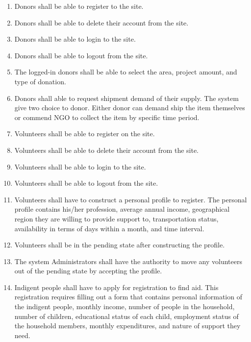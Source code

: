 \documentclass[a4paper,12pt]{report}
\begin{document}
	\begin{enumerate}
		\item Donors shall be able to register to the site.
		\item Donors shall be able to delete their account from the site.
		\item Donors shall be able to login to the site.
		\item Donors shall be able to logout from the site.
		\item The logged-in donors shall be able to select the area, project amount, and type of donation.
		
		\item Donors shall able to request shipment demand of their supply. The system give two choice to donor. Either donor can demand ship the item themselves or commend NGO to collect the item by specific time period.

		\item Volunteers shall be able to register on the site.
		
		\item Volunteers shall be able to delete their account from the site.
		\item Volunteers shall be able to login to the site.
		\item Volunteers shall be able to logout from the site.
		
		\item Volunteers shall have to construct a personal profile to register. The personal profile contains his/her profession, average annual income, geographical region they are willing to provide support to, transportation status, availability in terms of days within a month, and time interval.
		
		\item Volunteers shall be in the pending state after constructing the profile.
		
		\item The system Administrators shall have the authority to move any volunteers out of the pending state by accepting the profile.
		
		\item Indigent people shall have to apply for registration to find aid. This registration requires filling out a form that contains personal information of the indigent people, monthly income, number of people in the household, number of children, educational status of each child, employment status of the household members, monthly expenditures, and nature of support they need.
		

\end{enumerate}
\end{document}
